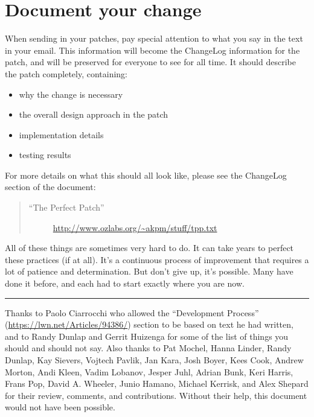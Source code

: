 \documentclass[a4paper,8pt,english]{sphinxmanual}
\begin{document}
\section{Document your change}
\label{process/howto:document-your-change}
When sending in your patches, pay special attention to what you say in
the text in your email.  This information will become the ChangeLog
information for the patch, and will be preserved for everyone to see for
all time.  It should describe the patch completely, containing:
\begin{itemize}
\item {} 
why the change is necessary

\item {} 
the overall design approach in the patch

\item {} 
implementation details

\item {} 
testing results

\end{itemize}

For more details on what this should all look like, please see the
ChangeLog section of the document:
\begin{quote}
\begin{description}
\item[{``The Perfect Patch''}] \leavevmode
\href{http://www.ozlabs.org/~akpm/stuff/tpp.txt}{http://www.ozlabs.org/\textasciitilde{}akpm/stuff/tpp.txt}

\end{description}
\end{quote}

All of these things are sometimes very hard to do. It can take years to
perfect these practices (if at all). It's a continuous process of
improvement that requires a lot of patience and determination. But
don't give up, it's possible. Many have done it before, and each had to
start exactly where you are now.


\bigskip\hrule{}\bigskip


Thanks to Paolo Ciarrocchi who allowed the ``Development Process''
(\href{https://lwn.net/Articles/94386/}{https://lwn.net/Articles/94386/}) section
to be based on text he had written, and to Randy Dunlap and Gerrit
Huizenga for some of the list of things you should and should not say.
Also thanks to Pat Mochel, Hanna Linder, Randy Dunlap, Kay Sievers,
Vojtech Pavlik, Jan Kara, Josh Boyer, Kees Cook, Andrew Morton, Andi
Kleen, Vadim Lobanov, Jesper Juhl, Adrian Bunk, Keri Harris, Frans Pop,
David A. Wheeler, Junio Hamano, Michael Kerrisk, and Alex Shepard for
their review, comments, and contributions.  Without their help, this
document would not have been possible.
\end{document}
